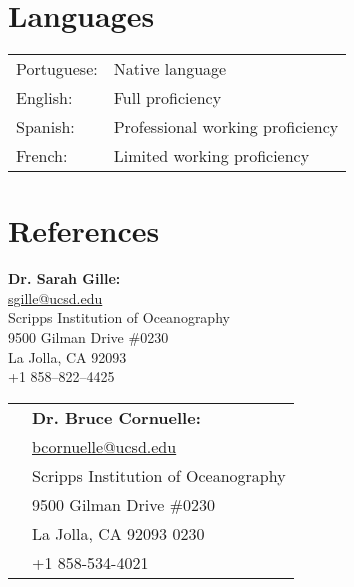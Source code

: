 \documentclass[10pt]{article}
\begin{document}
\vspace{.5cm}
\section*{Languages}
\vspace{.3cm}
\begin{tabular}{l l}
Portuguese: & Native language\\[3pt]
English:& Full proficiency\\[3pt] 
Spanish: & Professional working proficiency \\[3pt]
French:& Limited working proficiency \\
\end{tabular}
\vspace{.5cm}
\section*{References}
\vspace{.3cm}

\begin{minipage}[ht]{0.48\textwidth}
\begin{flushleft}
\textbf{Dr. Sarah Gille:} \\
\vspace{.1cm}
\url{sgille@ucsd.edu}\\
\vspace{.2cm}
\small{Scripps Institution of Oceanography}\\
\small{9500 Gilman Drive \#0230} \\
\small{La Jolla, CA 92093} \\
\small{+1 858--822--4425} 
\end{flushleft}
\end{minipage}
\hfill
\begin{minipage}[ht]{0.48\textwidth}
\vspace{.1cm}
\begin{flushright}
\begin{tabular}{l  l }
& \textbf{Dr. Bruce Cornuelle:} \\[5pt]
& \url{bcornuelle@ucsd.edu} \\[5pt]
&\small{Scripps Institution of Oceanography}\\
&\small{9500 Gilman Drive \#0230} \\
&\small{La Jolla, CA 92093 0230} \\
&\small{+1 858-534-4021} 
\end{tabular}
\end{flushright}
\end{minipage}
\end{document}
